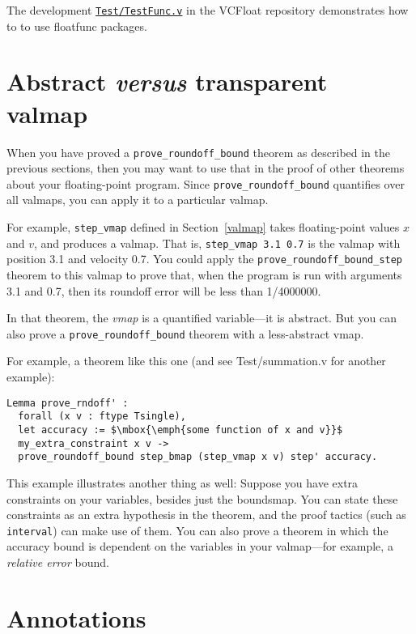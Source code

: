 \documentclass[article]{memoir}
\begin{document}
The development \href{../Test/TestFunc.v}{\lstinline{Test/TestFunc.v}} in the VCFloat repository demonstrates
how to to use floatfunc packages.


\chapter{Abstract \emph{versus} transparent valmap}

When you have proved a \lstinline{prove_roundoff_bound} theorem
as described in the previous sections, then you may want to
use that in the proof of other theorems about your floating-point
program.  Since \lstinline{prove_roundoff_bound} quantifies over
all valmaps, you can apply it to a particular valmap.

For example, \lstinline{step_vmap} defined in Section~\ref{valmap}
takes floating-point values $x$ and $v$, and produces a valmap.
That is, \lstinline{step_vmap 3.1 0.7} is the valmap with
position 3.1 and velocity 0.7.  You could apply the
\lstinline{prove_roundoff_bound_step} theorem to this valmap
to prove that, when the program is run with arguments
3.1 and 0.7, then its roundoff error will be less than 1/4000000.

In that theorem, the \emph{vmap} is a quantified variable---it is
abstract.  But you can also prove a \lstinline{prove_roundoff_bound}
theorem with a less-abstract vmap.

For example, a theorem like this one (and see Test/summation.v
for another example):
\begin{lstlisting}
Lemma prove_rndoff' :
  forall (x v : ftype Tsingle),
  let accuracy := $\mbox{\emph{some function of x and v}}$
  my_extra_constraint x v ->   
  prove_roundoff_bound step_bmap (step_vmap x v) step' accuracy.
\end{lstlisting}  

This example illustrates another thing as well:  Suppose you have
extra constraints on your variables, besides just the boundsmap.
You can state these constraints as an extra hypothesis
in the theorem, and the proof tactics (such as \lstinline{interval}) can
make use of them.  You can also prove a theorem in which the
accuracy bound is dependent on the variables in your valmap---for example,
a \emph{relative error} bound.

\chapter{Annotations}
\end{document}
